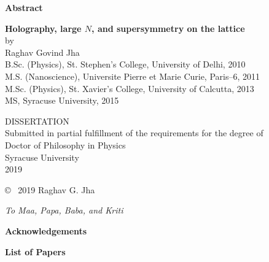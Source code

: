 \newpage
\thispagestyle{empty}
\begin{center}
{\bf\Large Abstract}\\[0.5em]
\end{center}

\begin{quote}

\end{quote}

\newpage
\thispagestyle{empty}

\begin{center}
{\bf\LARGE Holography, large $N$, and supersymmetry on the lattice}\\
[3em]
 by\\[1em]
{\large Raghav Govind Jha\\[1em]
B.Sc. (Physics), St. Stephen's College, University of Delhi, 2010\\
M.S. (Nanoscience), Universite Pierre et Marie Curie, Paris--6, 2011\\
M.Sc. (Physics), St. Xavier's College, University of Calcutta, 2013 \\ 
MS, Syracuse University, 2015 \\  [7em]}
\end{center}

\begin{center}
DISSERTATION\\
Submitted in partial fulfillment of the requirements for the degree of\\
Doctor of Philosophy in Physics\\[7em]
Syracuse University\\
{ 2019}\\[5em]

\end{center}

\newpage
\thispagestyle{empty}
\begin{center}
\vspace*{3in}
\copyright ~ 2019 Raghav G. Jha\\[1.5em]
\end{center}


\newpage
\thispagestyle{empty}
\clearpage
\vspace*{1in}
\begin{center}
{\textit{To Maa, Papa, Baba, and Kriti}} \\
	\vspace{2 cm}
	\vspace{5 cm}
\end{center}
\clearpage

\newpage 




\begin{center}
{\bf\Large Acknowledgements}\\[0.5em]
\end{center}

        

\newpage

\begin{center}
	{\bf\Large List of Papers}
\end{center}


   
\newpage
    \tableofcontents

 
\newpage    \listoffigures
\newpage    \listoftables

\newpage
